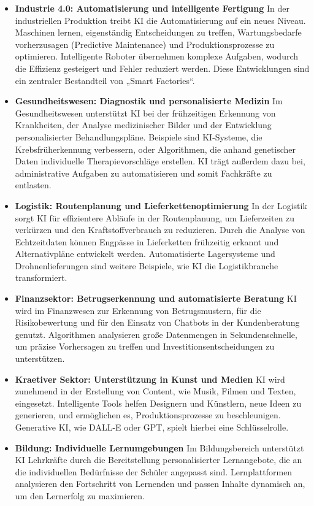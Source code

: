 \documentclass[a4paper,12pt]{article}
\begin{document}
\begin{itemize} \item \textbf{Industrie 4.0: Automatisierung und intelligente Fertigung}
In der industriellen Produktion treibt KI die Automatisierung auf ein neues Niveau. Maschinen lernen, eigenständig Entscheidungen zu treffen, Wartungsbedarfe vorherzusagen (Predictive Maintenance) und Produktionsprozesse zu optimieren. Intelligente Roboter übernehmen komplexe Aufgaben, wodurch die Effizienz gesteigert und Fehler reduziert werden. Diese Entwicklungen sind ein zentraler Bestandteil von „Smart Factories“.

\item \textbf{Gesundheitswesen: Diagnostik und personalisierte Medizin}  
Im Gesundheitswesen unterstützt KI bei der frühzeitigen Erkennung von Krankheiten, der Analyse medizinischer Bilder und der Entwicklung personalisierter Behandlungspläne. Beispiele sind KI-Systeme, die Krebsfrüherkennung verbessern, oder Algorithmen, die anhand genetischer Daten individuelle Therapievorschläge erstellen. KI trägt außerdem dazu bei, administrative Aufgaben zu automatisieren und somit Fachkräfte zu entlasten.

\item \textbf{Logistik: Routenplanung und Lieferkettenoptimierung}  
In der Logistik sorgt KI für effizientere Abläufe in der Routenplanung, um Lieferzeiten zu verkürzen und den Kraftstoffverbrauch zu reduzieren. Durch die Analyse von Echtzeitdaten können Engpässe in Lieferketten frühzeitig erkannt und Alternativpläne entwickelt werden. Automatisierte Lagersysteme und Drohnenlieferungen sind weitere Beispiele, wie KI die Logistikbranche transformiert.

\item \textbf{Finanzsektor: Betrugserkennung und automatisierte Beratung}  
KI wird im Finanzwesen zur Erkennung von Betrugsmustern, für die Risikobewertung und für den Einsatz von Chatbots in der Kundenberatung genutzt. Algorithmen analysieren große Datenmengen in Sekundenschnelle, um präzise Vorhersagen zu treffen und Investitionsentscheidungen zu unterstützen.

\item \textbf{Kraetiver Sektor: Unterstützung in Kunst und Medien}  
KI wird zunehmend in der Erstellung von Content, wie Musik, Filmen und Texten, eingesetzt. Intelligente Tools helfen Designern und Künstlern, neue Ideen zu generieren, und ermöglichen es, Produktionsprozesse zu beschleunigen. Generative KI, wie DALL-E oder GPT, spielt hierbei eine Schlüsselrolle.

\item \textbf{Bildung: Individuelle Lernumgebungen}  
Im Bildungsbereich unterstützt KI Lehrkräfte durch die Bereitstellung personalisierter Lernangebote, die an die individuellen Bedürfnisse der Schüler angepasst sind. Lernplattformen analysieren den Fortschritt von Lernenden und passen Inhalte dynamisch an, um den Lernerfolg zu maximieren.

\end{itemize}
\end{document}
